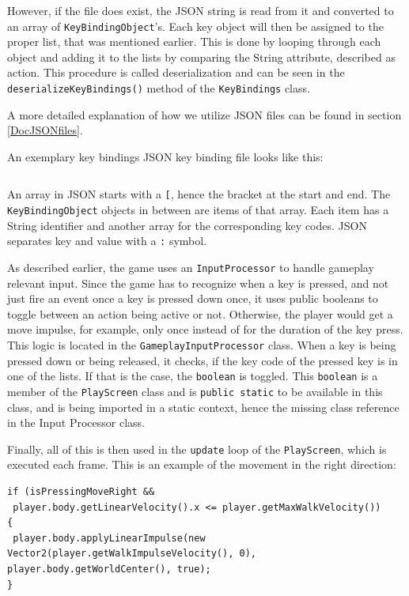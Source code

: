 \documentclass[12p]{article}
\begin{document}
However, if the file does exist, the JSON string is read from it and converted to an array of \texttt{KeyBindingObject}'s. Each key object will then be assigned to the proper list, that was mentioned earlier. This is done by looping through each object and adding it to the lists by comparing the String attribute, described as \texttt{}{action}. This procedure is called deserialization and can be seen in the \texttt{deserializeKeyBindings()} method of the \texttt{KeyBindings} class.

A more detailed explanation of how we utilize JSON files can be found in section \ref{DocJSONfiles}.

An exemplary key bindings JSON key binding file looks like this:

\newpage

\inputminted[linenos,breaklines]{json}{code/json/keybindings.json}

An array in JSON starts with a \texttt{[}, hence the bracket at the start and end. The \texttt{KeyBindingObject} objects in between are items of that array. Each item has a String identifier and another array for the corresponding key codes. JSON separates key and value with a \texttt{:} symbol.

As described earlier, the game uses an \texttt{InputProcessor} to handle gameplay relevant input. Since the game has to recognize when a key is pressed, and not just fire an event once a key is pressed down once, it uses public booleans to toggle between an action being active or not. Otherwise, the player would get a move impulse, for example, only once instead of for the duration of the key press. This logic is located in the \texttt{GameplayInputProcessor} class. When a key is being pressed down or being released, it checks, if the key code of the pressed key is in one of the lists. If that is the case, the \texttt{boolean} is toggled. This \texttt{boolean} is a member of the \texttt{PlayScreen} class and is \texttt{public static} to be available in this class, and is being imported in a static context, hence the missing class reference in the Input Processor class.

Finally, all of this is then used in the \texttt{update} loop of the \texttt{PlayScreen}, which is executed each frame. This is an example of the movement in the right direction:

\begin{verbatim}
if (isPressingMoveRight &&
 player.body.getLinearVelocity().x <= player.getMaxWalkVelocity()) 
{
 player.body.applyLinearImpulse(new Vector2(player.getWalkImpulseVelocity(), 0), player.body.getWorldCenter(), true);
}
\end{verbatim}
\end{document}
